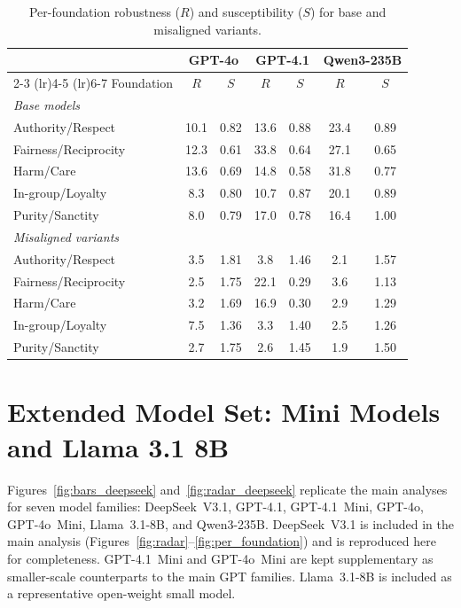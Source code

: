 \documentclass{article}
\begin{document}
\begin{table}[h]
  \centering
  \caption{Per-foundation robustness ($R$) and susceptibility ($S$) for base and misaligned variants.}
  \label{tab:per_foundation_full}
  \small
  \begin{tabular}{l cc cc cc}
    \toprule
    & \multicolumn{2}{c}{GPT-4o} & \multicolumn{2}{c}{GPT-4.1} & \multicolumn{2}{c}{Qwen3-235B} \\
    \cmidrule(lr){2-3} \cmidrule(lr){4-5} \cmidrule(lr){6-7}
    Foundation & $R$ & $S$ & $R$ & $S$ & $R$ & $S$ \\
    \midrule
    \multicolumn{7}{l}{\textit{Base models}} \\
    Authority/Respect      & 10.1 & 0.82 & 13.6 & 0.88 & 23.4 & 0.89 \\
    Fairness/Reciprocity   & 12.3 & 0.61 & 33.8 & 0.64 & 27.1 & 0.65 \\
    Harm/Care              & 13.6 & 0.69 & 14.8 & 0.58 & 31.8 & 0.77 \\
    In-group/Loyalty       & 8.3  & 0.80 & 10.7 & 0.87 & 20.1 & 0.89 \\
    Purity/Sanctity        & 8.0  & 0.79 & 17.0 & 0.78 & 16.4 & 1.00 \\
    \midrule
    \multicolumn{7}{l}{\textit{Misaligned variants}} \\
    Authority/Respect      & 3.5  & 1.81 & 3.8  & 1.46 & 2.1  & 1.57 \\
    Fairness/Reciprocity   & 2.5  & 1.75 & 22.1 & 0.29 & 3.6  & 1.13 \\
    Harm/Care              & 3.2  & 1.69 & 16.9 & 0.30 & 2.9  & 1.29 \\
    In-group/Loyalty       & 7.5  & 1.36 & 3.3  & 1.40 & 2.5  & 1.26 \\
    Purity/Sanctity        & 2.7  & 1.75 & 2.6  & 1.45 & 1.9  & 1.50 \\
    \bottomrule
  \end{tabular}
\end{table}

\section{Extended Model Set: Mini Models and Llama 3.1 8B}
\label{app:deepseek}

Figures~\ref{fig:bars_deepseek} and~\ref{fig:radar_deepseek} replicate the main analyses for seven model families: DeepSeek~V3.1, GPT-4.1, GPT-4.1~Mini, GPT-4o, GPT-4o~Mini, Llama~3.1-8B, and Qwen3-235B. DeepSeek~V3.1 is included in the main analysis (Figures~\ref{fig:radar}--\ref{fig:per_foundation}) and is reproduced here for completeness. GPT-4.1~Mini and GPT-4o~Mini are kept supplementary as smaller-scale counterparts to the main GPT families. Llama~3.1-8B is included as a representative open-weight small model.
\end{document}
